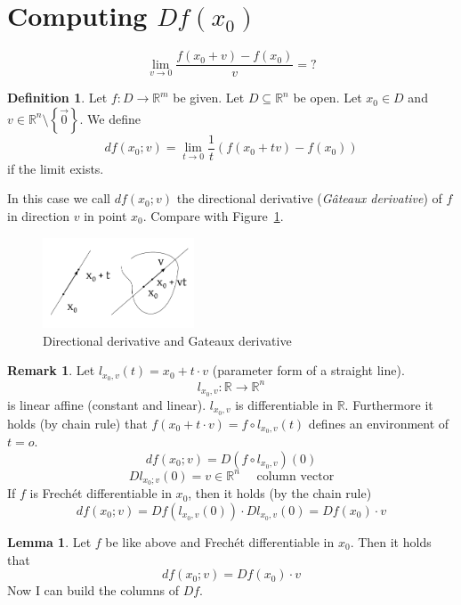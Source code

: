 \documentclass[a4paper,landscape,twocolumn]{article}
\theoremstyle{definition}
\newtheorem{defi}{Definition}
\newtheorem{rem}{Remark}
\newtheorem{lemma}{Lemma}
\newcommand\set[1]{\left\{#1\right\}}
\begin{document}
\section{Computing $Df(x_0)$}
%
\[ \lim_{v \to 0} \frac{f(x_0 + v) - f(x_0)}{v} = ? \]

\begin{defi}
  Let $f: D \to \mathbb R^m$ be given.
  Let $D \subseteq \mathbb R^n$ be open.
  Let $x_0 \in D$ and $v \in \mathbb R^n \setminus \set{\vec{0}}$.
  We define
  \[ df(x_0; v) = \lim_{t\to 0} \frac1{t} \left(f(x_0 + tv) - f(x_0)\right) \]
  if the limit exists.

  In this case we call $df(x_0; v)$ the directional derivative (\emph{G\^ateaux derivative})
  of $f$ in direction $v$ in point $x_0$. Compare with Figure~\ref{img:gatder}.
\end{defi}

\begin{figure}[t]
  \begin{center}
    \includegraphics[width=0.4\textwidth]{img/Gateaux_derivative.pdf}
    \caption{Directional derivative and Gateaux derivative}
    \label{img:gatder}
  \end{center}
\end{figure}

\begin{rem}
  Let $l_{x_0,v}(t) = x_0 + t \cdot v$ (parameter form of a straight line).
  \[ l_{x_0,v}: \mathbb R \to \mathbb R^n \]
  is linear affine (constant and linear).
  $l_{x_0,v}$ is differentiable in $\mathbb R$.
  Furthermore it holds (by chain rule) that $f(x_0 + t\cdot v) = f \circ l_{x_0,v}(t)$
  defines an environment of $t = o$.
  \[ df(x_0;v) = D(f \circ l_{x_0,v}) (0) \]
  \[ Dl_{x_0;v}(0) = v \in \mathbb R^n \quad \text{ column vector} \]
  If $f$ is Frech\'et differentiable in $x_0$, then it holds (by the chain rule)
  \[ df(x_0; v) = Df(l_{x_0,v}(0)) \cdot Dl_{x_0,v}(0) = Df(x_0) \cdot v \]
\end{rem}

\begin{lemma}
  Let $f$ be like above and Frech\'et differentiable in $x_0$. Then it holds that
  \[ df(x_0;v) = Df(x_0) \cdot v \]
  Now I can build the columns of $Df$.
\end{lemma}
\end{document}
